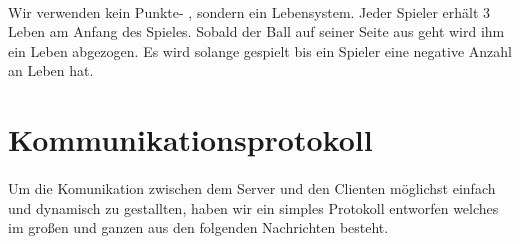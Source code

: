 \paragraph*{}
Wir verwenden kein Punkte- , sondern ein Lebensystem. Jeder Spieler erhält 3 Leben am Anfang des Spieles. Sobald der Ball auf seiner Seite aus geht wird ihm ein Leben abgezogen. Es wird solange gespielt bis ein Spieler eine negative Anzahl an Leben hat.  

\section*{Kommunikationsprotokoll}

\paragraph*{}
Um die Komunikation zwischen dem Server und den Clienten möglichst einfach und dynamisch zu gestallten, haben wir ein simples Protokoll entworfen welches im großen und ganzen aus den folgenden Nachrichten besteht.

\lstset{
	frame=none,
	}


